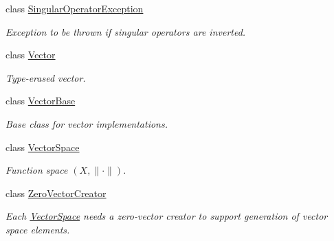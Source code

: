 \begin{DoxyCompactItemize}
class \hyperlink{classSpacy_1_1SingularOperatorException}{Singular\+Operator\+Exception}
\begin{DoxyCompactList}\small\item\em Exception to be thrown if singular operators are inverted. \end{DoxyCompactList}\item 
class \hyperlink{classSpacy_1_1Vector}{Vector}
\begin{DoxyCompactList}\small\item\em Type-\/erased vector. \end{DoxyCompactList}\item 
class \hyperlink{classSpacy_1_1VectorBase}{Vector\+Base}
\begin{DoxyCompactList}\small\item\em Base class for vector implementations. \end{DoxyCompactList}\item 
class \hyperlink{classSpacy_1_1VectorSpace}{Vector\+Space}
\begin{DoxyCompactList}\small\item\em Function space $(X,\|\cdot\|)$. \end{DoxyCompactList}\item 
class \hyperlink{classSpacy_1_1ZeroVectorCreator}{Zero\+Vector\+Creator}
\begin{DoxyCompactList}\small\item\em Each \hyperlink{classSpacy_1_1VectorSpace}{Vector\+Space} needs a zero-\/vector creator to support generation of vector space elements. \end{DoxyCompactList}\end{DoxyCompactItemize}
